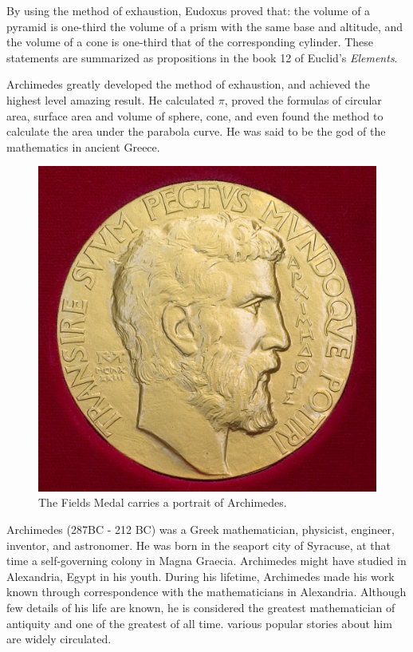 \documentclass{article}
\begin{document}
By using the method of exhaustion, Eudoxus proved that: the volume of a pyramid is one-third the volume of a prism with the same base and altitude, and the volume of a cone is one-third that of the corresponding cylinder. These statements are summarized as propositions in the book 12 of Euclid's {\em Elements}\cite{HanXueTao16}.

Archimedes greatly developed the method of exhaustion, and achieved the highest level amazing result. He calculated $\pi$, proved the formulas of circular area, surface area and volume of sphere, cone, and even found the method to calculate the area under the parabola curve. He was said to be the god of the mathematics in ancient Greece.

\begin{figure}
 \centering
 \includegraphics[scale=0.1]{img/FieldsMedal.jpg}
 \captionsetup{labelformat=empty}
 \caption{The Fields Medal carries a portrait of Archimedes.}
 \label{fig:FieldsMedal}
\end{figure}

Archimedes (287BC - 212 BC) was a Greek mathematician, physicist, engineer, inventor, and astronomer. He was born in the seaport city of Syracuse, at that time a self-governing colony in Magna Graecia. Archimedes might have studied in Alexandria, Egypt in his youth. During his lifetime, Archimedes made his work known through correspondence with the mathematicians in Alexandria. Although few details of his life are known, he is considered the greatest mathematician of antiquity and one of the greatest of all time. various popular stories about him are widely circulated.
\end{document}

